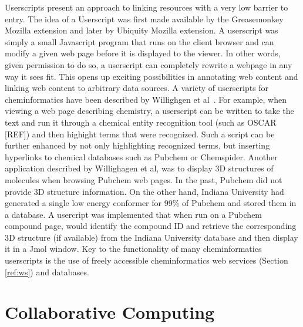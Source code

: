 \documentclass[12pt]{book}
\begin{document}
Userscripts present an approach to linking resources with a very low
barrier to entry. The idea of a Userscript was first made available by
the Greasemonkey Mozilla extension and later by Ubiquity Mozilla
extension. A userscript was simply a small Javascript program that
runs on the client browser and can modify a given web page before it
is displayed to the viewer. In other words, given permission to do so,
a userscript can completely rewrite a webpage in any way it sees
fit. This opens up exciting possibilities in annotating web content
and linking web content to arbitrary data sources. A variety of
userscripts for cheminformatics have been described by Willighgen et
al~\cite{Willighagen2007b}. For example, when viewing a web page describing
chemistry, a userscript can be written to take the text and run it
through a chemical entity recognition tool (such as OSCAR [REF]) and
then highight terms that were recognized. Such a script can be further
enhanced by not only highlighting recognized terms, but inserting
hyperlinks to chemical databases such as Pubchem or
Chemspider. Another application described by Willighagen et al, was to
display 3D structures of molecules when browsing Pubchem web pages. In
the past, Pubchem did not provide 3D structure information. On the
other hand, Indiana University had generated a single low energy
conformer for 99\% of Pubchem and stored them in a database. A
usercript was implemented that when run on a Pubchem compound page,
would identify the compound ID and retrieve the corresponding 3D
structure (if available) from the Indiana University database and then
display it in a Jmol window. Key to the functionality of many
cheminformatics userscripts is the use of freely accessible
cheminformatics web services (Section \ref{ref:ws}) and databases.

\section{Collaborative Computing}
\end{document}
